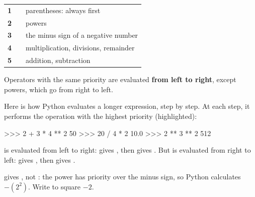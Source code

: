 \begin{tcolorbox}[otBase,colback=white,colframe=otRule,boxrule=0.5pt,left=4mm,right=4mm]
\par\vspace{1.6mm}
\renewcommand{\arraystretch}{1.32}%
\begin{tabularx}{\linewidth}{@{}>{\centering\arraybackslash}p{8mm}p{28mm}Y@{}}
\textbf{1} & \py{( )} & parentheses: always first\\
\textbf{2} & \py{**} & powers\\
\textbf{3} &  & the minus sign of a negative number\\
\textbf{4} & \py{*\ \ /\ \ //\ \ \%} & multiplication, divisions, remainder\\
\textbf{5} & \py{+\ \ -} & addition, subtraction\\
\end{tabularx}\par\vspace{1.4mm}
{\fontsize{9.8}{12.4}\selectfont Operators with the same priority are evaluated \textbf{from left to
right}, except powers, which go from right to left.}
\end{tcolorbox}

Here is how Python evaluates a longer expression, step by step. At each step, it performs the
operation with the highest priority (highlighted):

\begin{calcul}
\end{calcul}

\begin{console}
>>> 2 + 3 * 4 ** 2
50
>>> 20 / 4 * 2
10.0
>>> 2 ** 3 ** 2
512
\end{console}

 is evaluated from left to right:  gives , then 
gives . But  is evaluated from right to left:  gives ,
then  gives .

\begin{attention}
 gives , not : the power has priority over the minus sign, so Python
calculates $-(2^2)$. Write  to square $-2$.
\end{attention}

